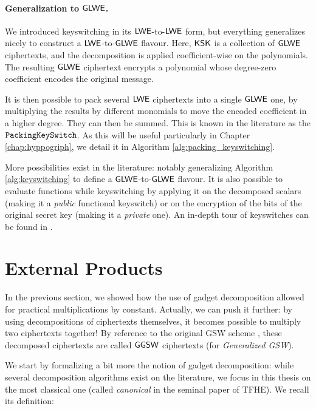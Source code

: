 \paragraph{Generalization to $\textsf{GLWE}$.}


We introduced keyswitching in its $\textsf{LWE}$-to-$\textsf{LWE}$ form, but everything generalizes nicely to construct a $\textsf{LWE}$-to-$\textsf{GLWE}$ flavour. Here, $\textsf{KSK}$ is a collection of $\textsf{GLWE}$ ciphertexts, and the decomposition is applied coefficient-wise on the polynomials. The resulting $\textsf{GLWE}$ ciphertext encrypts a polynomial whose degree-zero coefficient encodes the original message.


It is then possible to pack several $\textsf{LWE}$ ciphertexts into a single $\textsf{GLWE}$ one, by multiplying the results by different monomials to move the encoded coefficient in a higher degree. They can then be summed. This is known in the literature as the $\texttt{PackingKeySwitch}$. As this will be useful particularly in Chapter \ref{chap:hyppogriph}, we detail it in Algorithm \ref{alg:packing_keyswitching}.




More possibilities exist in the literature: notably generalizing Algorithm \ref{alg:keyswitching} to define a $\textsf{GLWE}$-to-$\textsf{GLWE}$ flavour. It is also possible to evaluate functions while keyswitching by applying it on the decomposed scalars (making it a \textit{public} functional keyswitch) or on the encryption of the bits of the original secret key (making it a \textit{private} one). An in-depth tour of keyswitches can be found in \cite{these_tap}.


\section{External Products}
\label{sec:external_products}

In the previous section, we showed how the use of gadget decomposition allowed for practical multiplications by constant. Actually, we can push it further: by using decompositions of ciphertexts themselves, it becomes possible to multiply two ciphertexts together! By reference to the original GSW scheme \cite{C:GenSahWat13}, these decomposed ciphertexts are called $\textsf{GGSW}$ ciphertexts (for \textit{Generalized GSW}).


We start by formalizing a bit more the notion of gadget decomposition: while several decomposition algorithms exist on the literature, we focus in this thesis on the most classical one (called \textit{canonical} in the seminal paper of TFHE). We recall its definition:

